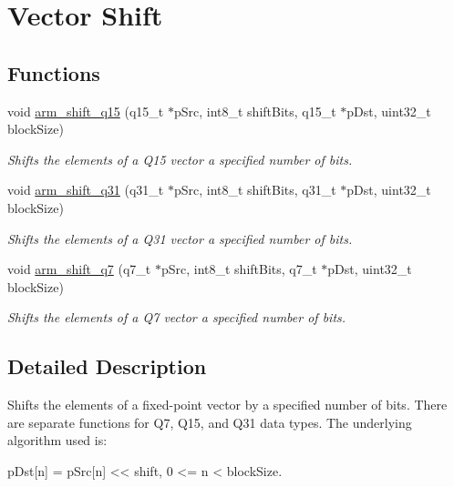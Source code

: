 \hypertarget{group__shift}{\section{Vector Shift}
\label{group__shift}
}
\subsection*{Functions}
\begin{DoxyCompactItemize}
\item 
void \hyperlink{group__shift_gaa1757e53279780107acc92cf100adb61}{arm\-\_\-shift\-\_\-q15} (q15\-\_\-t $\ast$p\-Src, int8\-\_\-t shift\-Bits, q15\-\_\-t $\ast$p\-Dst, uint32\-\_\-t block\-Size)
\begin{DoxyCompactList}\small\item\em Shifts the elements of a Q15 vector a specified number of bits. \end{DoxyCompactList}\item 
void \hyperlink{group__shift_ga387dd8b7b87377378280978f16cdb13d}{arm\-\_\-shift\-\_\-q31} (q31\-\_\-t $\ast$p\-Src, int8\-\_\-t shift\-Bits, q31\-\_\-t $\ast$p\-Dst, uint32\-\_\-t block\-Size)
\begin{DoxyCompactList}\small\item\em Shifts the elements of a Q31 vector a specified number of bits. \end{DoxyCompactList}\item 
void \hyperlink{group__shift_ga47295d08a685f7de700a48dafb4db6fb}{arm\-\_\-shift\-\_\-q7} (q7\-\_\-t $\ast$p\-Src, int8\-\_\-t shift\-Bits, q7\-\_\-t $\ast$p\-Dst, uint32\-\_\-t block\-Size)
\begin{DoxyCompactList}\small\item\em Shifts the elements of a Q7 vector a specified number of bits. \end{DoxyCompactList}\end{DoxyCompactItemize}


\subsection{Detailed Description}
Shifts the elements of a fixed-\/point vector by a specified number of bits. There are separate functions for Q7, Q15, and Q31 data types. The underlying algorithm used is\-:


\begin{DoxyPre}   
    pDst[n] = pSrc[n] << shift,   0 <= n < blockSize.   
\end{DoxyPre}


